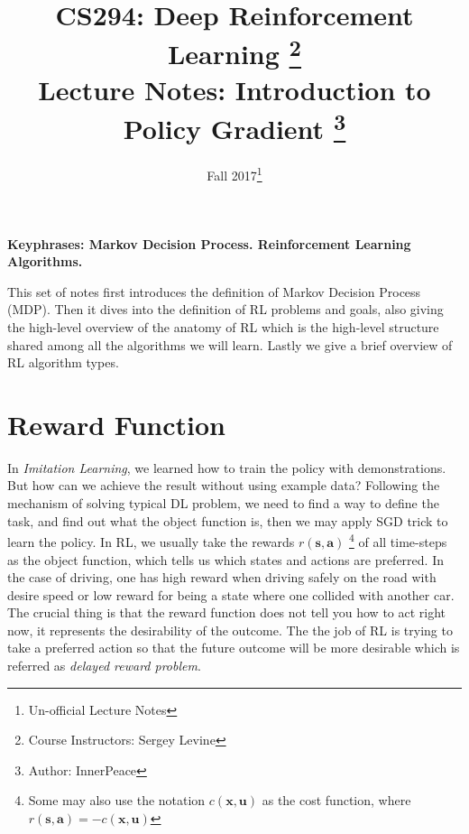 \documentclass{tufte-handout}
\title{CS294: Deep Reinforcement Learning
       \thanks{Course Instructors: Sergey Levine} \\
       \Large Lecture Notes: Introduction to Policy Gradient \thanks{Author: InnerPeace}}
\date{Fall 2017\thanks{Un-official Lecture Notes}} %
\begin{document}
\maketitle%



\textbf{Keyphrases: Markov Decision Process. Reinforcement Learning Algorithms.}

This set of notes first introduces the definition of Markov Decision Process (MDP). Then it dives into the definition of RL problems and goals, also giving the high-level overview of the anatomy of RL which is the high-level structure shared among all the algorithms we will learn. Lastly we give a brief overview of RL algorithm types.

\section{Reward Function}

In \emph{Imitation Learning}, we learned how to train the policy with demonstrations. But how can we achieve the result without using example data? Following the mechanism of solving typical DL problem, we need to find a way to define the task, and find out what the object function is, then we may apply SGD trick to learn the policy. In RL, we usually take the rewards $r(\mathbf{s}, \mathbf{a})$ \thanks{Some may also use the notation $c(\mathbf{x}, \mathbf{u}) $ as the cost function, where $r(\mathbf{s}, \mathbf{a}) = -c(\mathbf{x}, \mathbf{u}) $ } of all time-steps as the object function, which tells us which states and actions are preferred. In the case of driving, one has high reward when driving safely on the road with desire speed or low reward for being a state where one collided with another car. The crucial thing is that the reward function does not tell you how to act right now, it represents the desirability of the outcome. The the job of RL is trying to take a preferred action so that the future outcome will be more desirable which is referred as \emph{delayed reward problem}.
\end{document}
